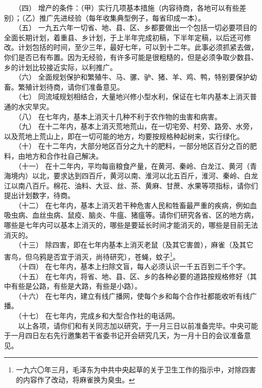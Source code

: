 \documentclass[cn,11pt,chinese]{elegantbook}
\begin{document}
　　（四） 增产的条件：（甲）实行几项基本措施（内容待商，各地可以有些差别）；（乙）推广先进经验（每年收集典型例子，每省印成一本）。\\
　　（五） 一九五六年一切省、地、县、区、乡都要做出一个包括一切必要项目的全面长期计划，着重县、乡计划，于上半年完成初稿，下半年定稿，以后还可修改。计划包括的时间，至少三年，最好七年，可以到十二年。此事必须抓紧去做，你们是否已有布置。因为无经验，有许多可能是很粗糙的，但是必须争取少数县、乡的计划比较接近实际，以利推广。\\
　　（六） 全面规划保护和繁殖牛、马、骡、驴、猪、羊、鸡、鸭，特别要保护幼畜。繁殖计划待商，请你们准备意见。\\
　　（七） 同流域规划相结合，大量地兴修小型水利，保证在七年内基本上消灭普通的水灾旱灾。\\
　　（八） 在七年内，基本上消灭十几种不利于农作物的虫害和病害。\\
　　（九） 在十二年内，基本上消灭荒地荒山，在一切宅旁、村旁、路旁、水旁，以及荒地上荒山上，即在一切可能的地方，均要按规格种起树来，实行绿化。\\
　　（十） 在十二年内，大部分地区百分之九十的肥料，一部分地区百分之百的肥料，由地方和合作社自己解决。\\
　　（十一） 在十二年内，平均每亩粮食产量，在黄河、秦岭、白龙江、黄河（青海境内）以北，要求达到四百斤，黄河以南、淮河以北五百斤，淮河、秦岭、白龙江以南八百斤。棉花、油料、大豆、丝、茶、黄麻、甘蔗、水果等项指标，请你们提出计划数字，待商。\\
　　（十二） 在七年内，基本上消灭若干种危害人民和牲畜最严重的疾病，例如血吸虫病、血丝虫病、鼠疫、脑炎、牛瘟、猪瘟等。请你们研究各省、区的地方病，哪些是七年内可以基本上消灭的，哪些是要延长时间才能消灭的，哪些是目前无法消灭的。\\
　　（十三） 除四害，即在七年内基本上消灭老鼠（及其它害兽），麻雀（及其它害鸟，但乌鸦是否宜于消灭，尚待研究），苍蝇，蚊子\footnote[1]{ 一九六〇年三月，毛泽东为中共中央起草的关于卫生工作的指示中，对除四害的内容作了改动，将麻雀换为臭虫。}。\\
　　（十四） 在七年内，基本上扫除文盲，每人必须认识一千五百到二千个字。\\
　　（十五） 在七年内，将省、地、县、区、乡的各种必要的道路按规格修好（其中有些是公路，有些是大路，有些是小路）。\\
　　（十六） 在七年内，建立有线广播网，使每个乡和每个合作社都能收听有线广播。\\
　　（十七） 在七年内，完成乡和大型合作社的电话网。\\
　　以上各项，请你们和有关同志加以研究，于一月三日以前准备完毕。中央可能于一月四日左右先行邀集若干省委书记开会研究几天，为一月十日的会议准备意见。\\
\end{document}

